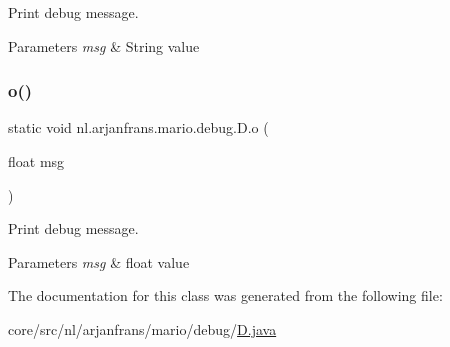 Print debug message. 


\begin{DoxyParams}{Parameters}
{\em msg} & String value \\
\hline
\end{DoxyParams}
\mbox{\label{classnl_1_1arjanfrans_1_1mario_1_1debug_1_1D_aa2b3bc37c1340bc9978ab30a3970e26e}} 
\subsubsection{\texorpdfstring{o()}{o()}\hspace{0.1cm}{\footnotesize\ttfamily [2/2]}}
{\footnotesize\ttfamily static void nl.\+arjanfrans.\+mario.\+debug.\+D.\+o (\begin{DoxyParamCaption}\item[{float}]{msg }\end{DoxyParamCaption})\hspace{0.3cm}{\ttfamily [static]}}



Print debug message. 


\begin{DoxyParams}{Parameters}
{\em msg} & float value \\
\hline
\end{DoxyParams}


The documentation for this class was generated from the following file\+:\begin{DoxyCompactItemize}
\item 
core/src/nl/arjanfrans/mario/debug/\hyperlink{D_8java}{D.\+java}\end{DoxyCompactItemize}
